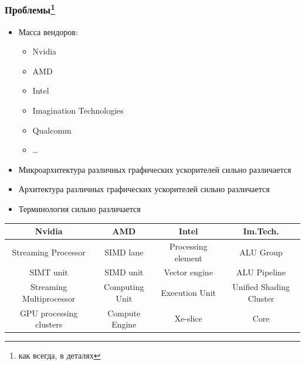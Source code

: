 \documentclass[xcolor=table,aspectratio=169]{beamer}
\begin{document}
\begin{frame}[fragile]
  \frametitle{Проблемы\footnote{как всегда, в деталях}}
  \begin{itemize}
    \item Масса вендоров:
    \begin{multicols}{3}
    \begin{itemize}
      \item Nvidia
      \item AMD
      \item Intel
      \item Imagination Technologies
      \item Qualcomm
      \item \ldots
    \end{itemize}
  \end{multicols}
    \item Микроархитектура различных графических ускорителей сильно различается
    \item Архитектура различных графических ускорителей сильно различается
    \item Терминология сильно различается
  \end{itemize}
  \begin{center}
  \begin{tabular}{ c c c c}
    \rowcolor{lightgray}
    Nvidia & AMD & Intel & Im.Tech. \\ 
    \hline
    \hline
    Streaming Processor      & SIMD lane      & Processing element & ALU Group               \\  
    \rowcolor{lightgray}
    SIMT unit                & SIMD unit      & Vector engine      & ALU Pipeline            \\
    Streaming Multiprocessor & Computing Unit & Execution Unit     & Unified Shading Cluster \\
    \rowcolor{lightgray}
    GPU processing clusters  & Compute Engine & Xe-slice           & Core
   \end{tabular}
  \end{center}
\end{frame}
\end{document}
